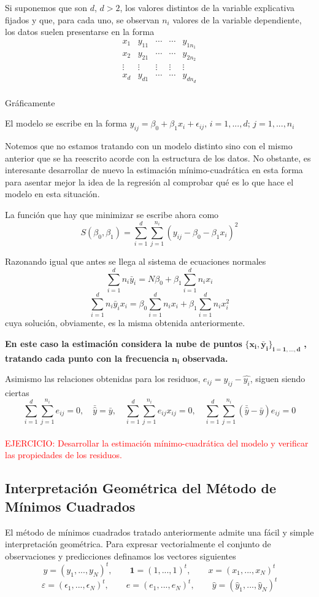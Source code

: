 \documentclass[10pt,a4paper]{book}
\begin{document}
Si suponemos que son $d$, $d > 2$, los valores distintos de la variable explicativa fijados y que, para cada uno, se observan $n_i$ valores de la variable dependiente, los datos suelen presentarse en la forma $$\begin{array}{c|cccc}
x_1 & y_{11} & \cdots & \cdots & y_{1n_1} \\
x_2 & y_{21} & \cdots & \cdots & y_{2n_2}  \\
\vdots & \vdots & \vdots & \vdots & \vdots \\
x_d & y_{d1} & \cdots & \cdots & y_{dn_d}  \\
\end{array}$$

Gráficamente

El modelo se escribe en la forma $y_{ij}=\beta_0+\beta_1x_i+\epsilon_{ij},\, i=1,...,d;\, j=1,...,n_i$

Notemos que no estamos tratando con un modelo distinto sino con el mismo anterior que se ha reescrito acorde con la estructura de los datos. No obstante, es interesante desarrollar de nuevo la estimación mínimo-cuadrática en esta forma para asentar mejor la idea de la regresión al comprobar qué es lo que hace el modelo en esta situación.

La función que hay que minimizar se escribe ahora como $$S(\beta_0,\beta_1)=\sum^d_{i=1}\sum^{n_i}_{j=1}(y_{ij}-\beta_0-\beta_1x_i)^2$$

Razonando igual que antes se llega al sistema de ecuaciones normales $$\sum^d_{i=1}n_i\bar{y}_i=N\beta_0+\beta_1\sum^d_{i=1}n_ix_i$$ $$\sum^d_{i=1}n_i\bar{y}_ix_i=\beta_0\sum^d_{i=1}n_ix_i+\beta_1\sum^d_{i=1}n_ix_i^2$$ cuya solución, obviamente, es la misma obtenida anteriormente.

\textbf{En este caso la estimación considera la nube de puntos} $\mathbf{\{x_i,\bar{y}_i\}_{i=1,...,d}}$ \textbf{, tratando cada punto con la frecuencia} $\mathbf{n_i}$ \textbf{observada.}

Asimismo las relaciones obtenidas para los residuos, $e_{ij}=y_{ij}-\widehat{y_i}$, siguen siendo ciertas $$\sum^d_{i=1}\sum^{n_i}_{j=1}e_{ij}=0,\quad \bar{\widehat{y}}=\bar{y}, \quad \sum^d_{i=1}\sum^{n_i}_{j=1}e_{ij}x_{ij}=0, \quad \sum^d_{i=1}\sum^{n_i}_{j=1}(\bar{\widehat{y}}-\bar{y})e_{ij}=0$$
\ \\

\textcolor{red}{EJERCICIO: Desarrollar la estimación mínimo-cuadrática del modelo y verificar las propiedades de los residuos.}

		\subsection{Interpretación Geométrica del Método de Mínimos Cuadrados}
El método de mínimos cuadrados tratado anteriormente admite una fácil y simple interpretación geométrica. Para expresar vectorialmente el conjunto de observaciones y predicciones definamos los vectores siguientes $$y=(y_1,...,y_N)^t,\qquad \mathbf{1}=(1,...,1)^t,\qquad x=(x_1,...,x_N)^t$$ $$\varepsilon=(\epsilon_1,...,\epsilon_N)^t,\qquad e=(e_1,...,e_N)^t,\qquad \widehat{y}=(\widehat{y}_1,...,\widehat{y}_N)^t$$
\end{document}
